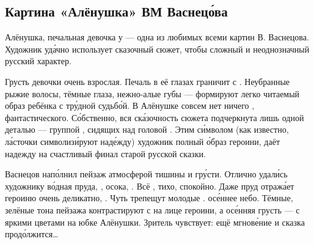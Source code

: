 \subsection{Картина «Алёнушка» ВМ Васнец\'{о}ва}

Алёнушка, печальная девочка у  --- одна из любимых всеми картин В. Васнецова. Художник уд\'{а}чно использует сказочный сюжет, чтобы  сложный и неоднозначный русский характер.

Грусть девочки очень взрослая. Печаль в её глазах граничит с . Неубранные рыжие волосы, тёмные глаза, нежно-алые губы --- формируют легко читаемый образ ребёнка с тр\'{у}дной судьб\'{о}й.
В Алёнушке совсем нет ничего , фантастического.
С\'{о}бственно, вся ск\'{а}зочность сюжета подчеркнута лишь одной деталью --- группой , сидящих над головой . Этим с\'{и}мволом (как известно, л\'{а}сточки символиз\'{и}руют над\'{е}жду) художник  полный  \'{о}браз героини, даёт надежду на счастливый финал старой русской сказки.

Васнецов нап\'{о}лнил  пейзаж атмосферой тишины и гр\'{у}сти.
Отлично удал\'{и}сь художнику в\'{о}дная  пруда, , осока, .
Всё , тихо, спокойно.
Даже пруд отраж\'{а}ет героиню очень деликатно, .
Чуть трепещут молодые .   ос\'{е}ннее небо.
Тёмные, зелёные тона пейзажа контрастируют с  на лице героини, а ос\'{е}нняя грусть --- с яркими цветами на юбке Алёнушки. Зритель чувствует: ещё мгнов\'{е}ние и сказка прод\'{о}лжится\dots




